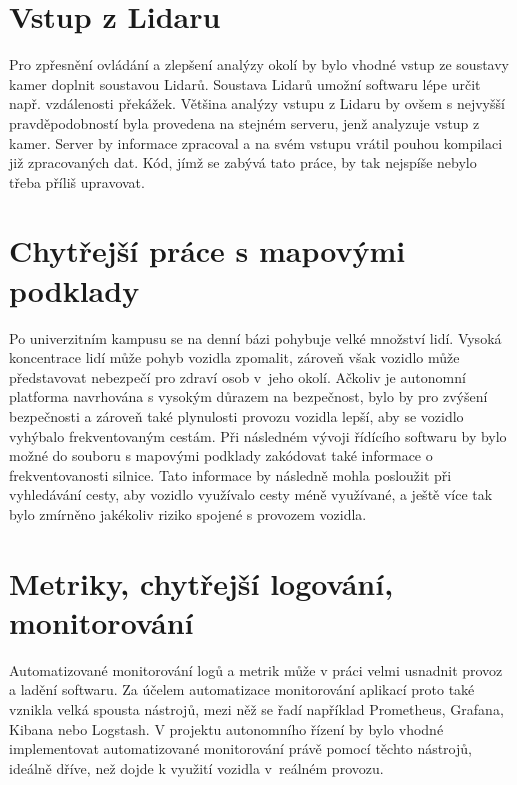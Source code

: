 \documentclass[czech, bachelor]{diploma}
\begin{document}
\section{Vstup z Lidaru}

Pro zpřesnění ovládání a zlepšení analýzy okolí by bylo vhodné vstup ze soustavy kamer doplnit soustavou Lidarů. Soustava Lidarů
umožní softwaru lépe určit např. vzdálenosti překážek. Většina analýzy vstupu z Lidaru by ovšem s nejvyšší pravděpodobností byla
provedena na stejném serveru, jenž analyzuje vstup z kamer. Server by informace zpracoval a na svém vstupu vrátil pouhou kompilaci
již zpracovaných dat. Kód, jímž se zabývá tato práce, by tak nejspíše nebylo třeba příliš upravovat.

\section{Chytřejší práce s mapovými podklady} \label{smarter-maps}

Po univerzitním kampusu se na denní bázi pohybuje velké množství lidí. Vysoká koncentrace lidí může pohyb vozidla zpomalit,
zároveň však vozidlo může představovat nebezpečí pro zdraví osob v~jeho okolí. Ačkoliv je autonomní platforma navrhována s vysokým
důrazem na bezpečnost, bylo by pro zvýšení bezpečnosti a zároveň také plynulosti provozu vozidla lepší, aby se vozidlo vyhýbalo
frekventovaným cestám. Při následném vývoji řídícího softwaru by bylo možné do souboru s mapovými podklady zakódovat také
informace o frekventovanosti silnice. Tato informace by následně mohla posloužit při vyhledávání cesty, aby vozidlo využívalo
cesty méně využívané, a ještě více tak bylo zmírněno jakékoliv riziko spojené s provozem vozidla.

\section{Metriky, chytřejší logování, monitorování}

Automatizované monitorování logů a metrik může v práci velmi usnadnit provoz a ladění softwaru. Za účelem automatizace
monitorování aplikací proto také vznikla velká spousta nástrojů, mezi něž se řadí například Prometheus, Grafana, Kibana nebo
Logstash. V projektu autonomního řízení by bylo vhodné implementovat automatizované monitorování právě pomocí těchto nástrojů,
ideálně dříve, než dojde k využití vozidla v~reálném provozu.
\end{document}
